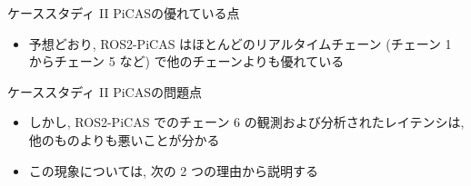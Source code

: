 

\begin{frame}{ケーススタディ II PiCASの優れている点}
    \begin{itemize}
        \item 予想どおり, ROS2-PiCAS はほとんどのリアルタイムチェーン (チェーン 1 からチェーン 5 など) で他のチェーンよりも優れている
    \end{itemize}
\end{frame}

\begin{frame}{ケーススタディ II PiCASの問題点}
    \begin{itemize}
        \item しかし, ROS2-PiCAS でのチェーン 6 の観測および分析されたレイテンシは, 他のものよりも悪いことが分かる
        \item この現象については, 次の 2 つの理由から説明する
    \end{itemize}
\end{frame}

